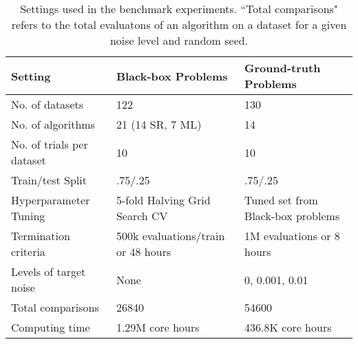 \begin{table}
    \footnotesize
    \center
    \caption{
        Settings used in the benchmark experiments. 
        ``Total comparisons" refers to the total evaluatons of an algorithm on a dataset for a given noise level and random seed.
    }\label{tbl:exp}
    \begin{tabular}{lll}
        Setting                     &   Black-box Problems              &   Ground-truth Problems                   \\
        \midrule
        No. of datasets             &   122                             &   130                                     \\
        No. of algorithms           &   21 (14 SR, 7 ML)                &   14                                      \\
        No. of trials per dataset   &   10                              &   10                                      \\
        Train/test Split            &   .75/.25                         &   .75/.25                                 \\
        Hyperparameter Tuning       &   5-fold Halving Grid Search CV   &   Tuned set from Black-box problems        \\
        Termination criteria        &   500k evaluations/train or 48 hours    &   1M evaluations or 8 hours         \\ 
        Levels of target noise      &   None                            &   0, 0.001, 0.01                          \\
        Total comparisons           &   26840                           &   54600                                   \\ 
        Computing time              &   1.29M core hours                &   436.8K core hours                       \\  
        \bottomrule
    \end{tabular}
\end{table}
